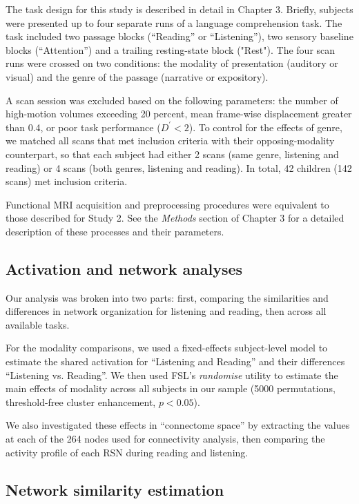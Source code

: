 The task design for this study is described in detail in Chapter 3. Briefly, subjects were presented up to four separate runs of a language comprehension task. The task included two passage blocks (``Reading'' or ``Listening''), two sensory baseline blocks (``Attention'') and a trailing resting-state block ("Rest"). The four scan runs were crossed on two conditions: the modality of presentation (auditory or visual) and the genre of the passage (narrative or expository). 

A scan session was excluded based on the following parameters: the number of high-motion volumes exceeding 20 percent, mean frame-wise displacement greater than 0.4, or poor task performance ($D^\prime < 2$). To control for the effects of genre, we matched all scans that met inclusion criteria with their opposing-modality counterpart, so that each subject had either 2 scans (same genre, listening and reading) or 4 scans (both genres, listening and reading). In total, 42 children (142 scans) met inclusion criteria.

Functional MRI acquisition and preprocessing procedures were equivalent to those described for Study 2. See the \textit{Methods} section of Chapter 3 for a detailed description of these processes and their parameters.

\subsection{Activation and network analyses}

Our analysis was broken into two parts: first, comparing the similarities and differences in network organization for listening and reading, then across all available tasks. 

For the modality comparisons, we used a fixed-effects subject-level model to estimate the shared activation for ``Listening and Reading'' and their differences ``Listening vs. Reading''. We then used FSL's \textit{randomise} utility to estimate the main effects of modality across all subjects in our sample (5000 permutations, threshold-free cluster enhancement, $p < 0.05$).

We also investigated these effects in ``connectome space'' by extracting the values at each of the 264 nodes used for connectivity analysis, then comparing the activity profile of each RSN during reading and listening.

\subsection{Network similarity estimation}

